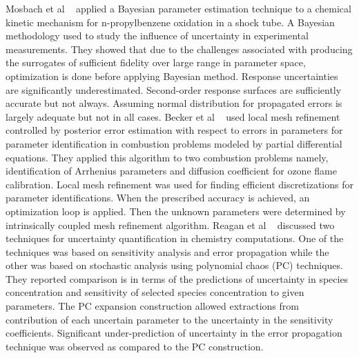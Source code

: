 Mosbach et al ~\cite{mosbac} applied a Bayesian parameter estimation technique to a chemical kinetic mechanism for n-propylbenzene oxidation in a shock tube. A Bayesian methodology used to study the influence of uncertainty in experimental measurements. They showed that  due to the challenges associated with producing the surrogates of sufficient fidelity over large range in parameter space, optimization is done before applying Bayesian method. Response uncertainties are significantly underestimated. Second-order response surfaces are sufficiently accurate but not always. Assuming normal distribution for propagated errors is largely adequate but not in all cases. Becker et al ~\cite{Becker2005} used local mesh refinement controlled by posterior error estimation with respect to errors in parameters for parameter identification in combustion problems modeled by partial differential equations. They applied this algorithm to two combustion problems namely, identification of Arrhenius parameters and diffusion coefficient for ozone flame calibration. Local mesh refinement was used for finding efficient discretizations for parameter identifications. When the prescribed accuracy is achieved, an optimization loop is applied. Then the unknown parameters were determined by intrinsically coupled mesh refinement algorithm. Reagan et al ~\cite{Reagan} discussed two techniques for uncertainty quantification in chemistry computations. One of the techniques was based on sensitivity analysis and error propagation while the other was based on stochastic analysis using polynomial chaos (PC) techniques. They reported comparison is in terms of the predictions of uncertainty in species concentration and sensitivity of selected species concentration to given parameters. The PC expansion construction allowed extractions from contribution of each uncertain parameter to the uncertainty in the sensitivity coefficients. Significant under-prediction of uncertainty in the error propagation technique was observed as compared to the PC construction. 


